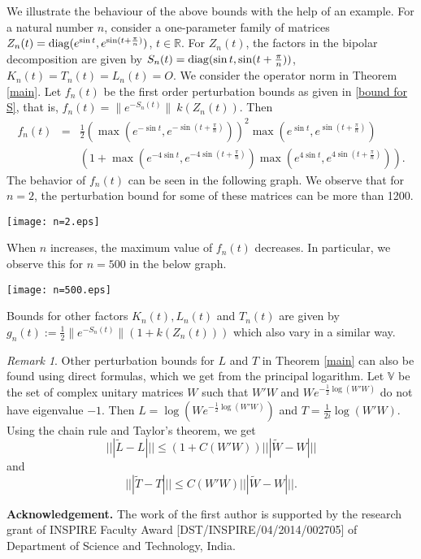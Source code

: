 \documentclass[12pt,epsfig,reqno]{amsart}
\newcommand{\diag}{{\rm diag}}
\theoremstyle{remark}
\newtheorem{remark}[thm]{Remark}
\begin{document}
We illustrate the behaviour of the above bounds with the help of an example. For a natural number $n$, consider a one-parameter family of matrices $Z_n(t)= \diag(e^{\sin t}, e^{\sin (t+\frac{\pi}{n})})$, $t\in \mathbb R$.  For $Z_n(t)$, the factors in the bipolar decomposition are given by $S_n(t)= \diag(\sin t, \sin(t+\frac{\pi}{n}))$, $K_n(t)=T_n(t)= L_n(t)= O$. We consider the operator norm in Theorem \ref{main}. Let $f_n(t)$ be the first order perturbation bounds as given in \eqref{bound for S}, that is, $f_n(t)= \|e^{-S_n(t)} \| \ k(Z_n(t))$. Then  \begin{eqnarray}f_n(t)&=& \frac{1}{2}\left(\max(e^{-\sin t}, e^{-\sin(t+\frac{\pi}{n})})\right)^2 \max(e^{\sin t}, e^{\sin(t+\frac{\pi}{n})})\nonumber\\ &&\left(1+\max(e^{-4\sin t}, e^{-4\sin(t+\frac{\pi}{n})}) \max(e^{4\sin t}, e^{4\sin(t+\frac{\pi}{n})})\right).\nonumber
    \end{eqnarray}
The behavior of $f_n(t)$ can be seen in the following graph.  We observe that for $n=2$, the perturbation bound for some of these matrices can be more than 1200.
  \begin{center}\texttt{[image: n=2.eps]}\end{center}
When $n$ increases, the maximum value of $f_n(t)$ decreases. In particular, we observe this for $n=500$ in the below graph.
\begin{center}\texttt{[image: n=500.eps]}\end{center}
Bounds for other factors $K_n(t), L_n(t)$ and $T_n(t)$ are given by $g_n(t):= \frac{1}{2}\|e^{-S_n(t)}\| (1+k(Z_n(t)))$ which also vary in a similar way.

\begin{remark} Other perturbation bounds for $L$ and $T$ in Theorem \ref{main} can also be found using direct formulas, which we get from the principal logarithm. Let $\mathbb V$ be the set of  complex unitary matrices $W$ such that $W'W$ and $W e^{-\frac{1}{2}\log(W'W)}$ do not have eigenvalue $-1$. Then $L=\log(W e^{-\frac{1}{2}\log(W'W)})$ and $ T=  \frac{1}{2i}\log(W'W).$
Using the chain rule and Taylor's theorem, we get
$$|||\tilde{L}-L|||\leq \left(1+C(W'W)\right)|||\tilde{W}-W|||$$
and
$$|||\tilde{T}-T|||\leq C(W'W)|||\tilde{W}-W|||.$$
\end{remark}

\textbf{Acknowledgement.} The work of the first author is supported by  the research grant of INSPIRE Faculty Award [DST/INSPIRE/04/2014/002705] of Department of Science and Technology, India.
\end{document}
